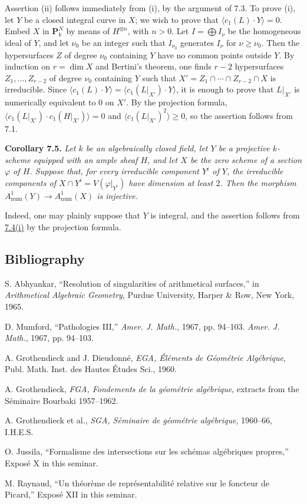 Assertion (ii) follows immediately from (i), by the argument of 7.3. To
prove (i), let $Y$ be a closed integral curve in $X$; we wish to prove
that $\langle c_1(L)\cdot Y\rangle=0$. Embed $X$ in $\mathbf P^N_k$ by
means of $H^{\otimes n}$, with $n>0$. Let $I=\bigoplus I_\nu$ be the
homogeneous ideal of $Y$, and let $\nu_0$ be an integer such that
$I_{\nu_0}$ generates $I_\nu$ for $\nu\geq\nu_0$. Then the
hypersurfaces $Z$ of degree $\nu_0$ containing $Y$ have no common points
outside $Y$. By induction on $r=\dim X$ and Bertini's theorem, one finds
$r-2$ hypersurfaces $Z_1,\ldots,Z_{r-2}$ of degree $\nu_0$ containing
$Y$ such that $X'=Z_1\cap\cdots\cap Z_{r-2}\cap X$ is irreducible.
Since $\langle c_1(L)\cdot Y\rangle
=\langle c_1(L|_{X'})\cdot Y\rangle$, it is enough to prove that
$L|_{X'}$ is numerically equivalent to $0$ on $X'$. By the projection
formula, $\langle c_1(L|_{X'})\cdot c_1(H|_{X'})\rangle=0$ and
$\langle c_1(L|_{X'})^2\rangle\geq0$, so the assertion follows from 7.1.

\textbf{Corollary 7.5.} \emph{Let $k$ be an algebraically closed field,
let $Y$ be a projective $k$-scheme equipped with an ample sheaf $H$, and
let $X$ be the zero scheme of a section $\varphi$ of $H$. Suppose that,
for every irreducible component $Y^i$ of $Y$, the irreducible components
of $X\cap Y^i=V(\varphi|_{Y^i})$
have dimension at least $2$. Then the morphism
$A^1_{\mathrm{num}}(Y)\longrightarrow A^1_{\mathrm{num}}(X)$ is
injective.}

Indeed, one may plainly suppose that $Y$ is integral, and the assertion follows from \hyperlink{sga6.e13.cor.7-4}{7.4(i)} by the projection formula.

\subsection*{Bibliography}
\begin{enumerate}[label={[\arabic*]}]
\item S. Abhyankar, ``Resolution of singularities of arithmetical surfaces,'' in \emph{Arithmetical Algebraic Geometry}, Purdue University, Harper \& Row, New York, 1965.
\item D. Mumford, ``Pathologies III,'' \emph{Amer. J. Math.}, 1967, pp. 94--103. \emph{Amer. J. Math.}, 1967, pp. 94--103.
\item A. Grothendieck and J. Dieudonn\'e, \emph{EGA, \'El\'ements de G\'eom\'etrie Alg\'ebrique}, Publ. Math. Inst. des Hautes \'Etudes Sci., 1960.
\item A. Grothendieck, \emph{FGA, Fondements de la g\'eom\'etrie alg\'ebrique}, extracts from the S\'eminaire Bourbaki 1957--1962.
\item A. Grothendieck et al., \emph{SGA, S\'eminaire de g\'eom\'etrie alg\'ebrique}, 1960--66, I.H.E.S.
\item O. Jussila, ``Formalisme des intersections sur les sch\'emas alg\'ebriques propres,'' Expos\'e X in this seminar.
\item M. Raynaud, ``Un th\'eor\`eme de repr\'esentabilit\'e relative sur le foncteur de Picard,'' Expos\'e XII in this seminar.
\end{enumerate}

